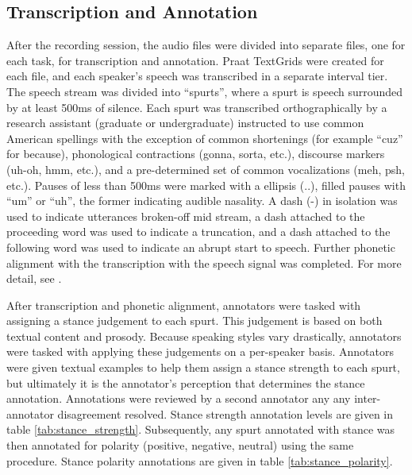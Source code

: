 \subsection{Transcription and Annotation} 
\label{subsec:transcription_and_annotation} 

After the recording session, the audio files were divided into separate files, one for each task, for transcription and annotation.  Praat TextGrids \citep{boersma2002praat} were created for each file, and each speaker's speech was transcribed in a separate interval tier.  The speech stream was divided into ``spurts'', where a spurt is speech surrounded by at least 500ms of silence.  Each spurt was transcribed orthographically by a research assistant (graduate or undergraduate) instructed to use common American spellings with the exception of common shortenings (for example ``cuz'' for because), phonological contractions (gonna, sorta, etc.), discourse markers (uh-oh, hmm, etc.), and a pre-determined set of common vocalizations (meh, psh, etc.).  Pauses of less than 500ms were marked with a ellipsis (..), filled pauses with ``um'' or ``uh'', the former indicating audible nasality.  A dash (-) in isolation was used to indicate utterances broken-off mid stream, a dash attached to the proceeding word was used to indicate a truncation, and a dash attached to the following word was used to indicate an abrupt start to speech.  Further phonetic alignment with the transcription with the speech signal was completed.  For more detail, see \cite{freeman2015phonetics}.  

After transcription and phonetic alignment, annotators were tasked with assigning a stance judgement to each spurt.  This judgement is based on both textual content and prosody.  Because speaking styles vary drastically, annotators were tasked with applying these judgements on a per-speaker basis.  Annotators were given textual examples to help them assign a stance strength to each spurt, but ultimately it is the annotator's perception that determines the stance annotation.  Annotations were reviewed by a second annotator any any inter-annotator disagreement resolved.  Stance strength annotation levels are given in table \ref{tab:stance_strength}.  Subsequently, any spurt annotated with stance was then annotated for polarity (positive, negative, neutral) using the same procedure.  Stance polarity annotations are given in table \ref{tab:stance_polarity}.  

